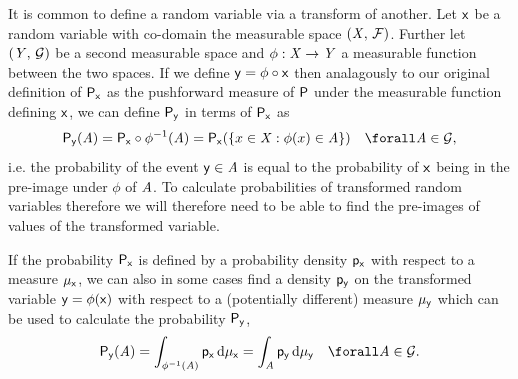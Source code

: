 It is common to define a random variable via a transform of another. Let $\mathsf{x}$ be a random variable with co-domain the measurable space $(\mathit{X},\,\mathcal{F})$. Further let $(\mathit{Y},\,\mathcal{G})$ be a second measurable space and $\phi : \mathit{X} \to \mathit{Y}$ a measurable function between the two spaces. If we define $\mathsf{y} = \phi \circ \mathsf{x}$ then analagously to our original definition of $\mathsf{P}_{\mathsf{x}}$ as the pushforward measure of $\mathsf{P}$ under the measurable function defining $\mathsf{x}$, we can define $\mathsf{P}_{\mathsf{y}}$ in terms of $\mathsf{P}_{\mathsf{x}}$ as
\begin{equation}\label{eq:change-of-variables-probability}
  \prob{\rvar{y}}(\set{A}) = 
  \prob{\rvar{x}} \circ \phi^{-1}(\set{A}) =
  \prob{\rvar{x}}\lpa \lbrace x \in \set{X} : \phi(x) \in \set{A} \rbrace \rpa
  \quad \forall \set{A} \in \sset{G},
\end{equation}
i.e. the probability of the event $\mathsf{y} \in \mathit{A}$ is equal to the probability of $\mathsf{x}$ being in the pre-image under $\phi$ of $\mathit{A}$. To calculate probabilities of transformed random variables therefore we will therefore need to be able to find the pre-images of values of the transformed  variable.

If the probability $\mathsf{P}_{\mathsf{x}}$ is defined by a probability density $\mathsf{p}_{\mathsf{x}}$ with respect to a measure $\mu_{\mathsf{x}}$, we can also in some cases find a density $\mathsf{p}_{\mathsf{y}}$ on the transformed variable $\mathsf{y} = \phi(\mathsf{x})$ with respect to a (potentially different) measure $\mu_{\mathsf{y}}$ which can be used to calculate the probability $\mathsf{P}_{\mathsf{y}}$, 
\begin{equation}\label{eq:change-of-variables-general}
  \prob{\rvar{y}}(\set{A}) =
  \int_{\phi^{-1}(\set{A})} \pden{\rvar{x}} \,\dr\mu_{\rvar{x}} = 
  \int_{\set{A}} \pden{\rvar{y}} \,\dr\mu_{\rvar{y}}
  \quad \forall \set{A} \in \sset{G}.
\end{equation}

